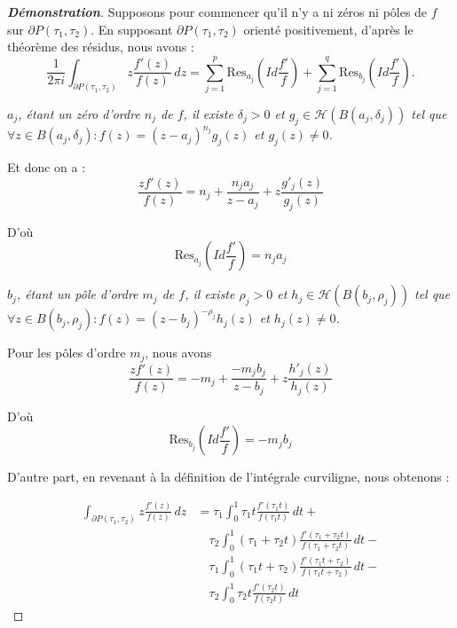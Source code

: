 \documentclass[12pt]{article}
\begin{document}
        \begin{proof}[\textbf{Démonstration}]
        Supposons pour commencer qu'il n'y a ni zéros ni pôles de \( f \) sur \( \partial P(\tau_1, \tau_2) \). En supposant \( \partial P(\tau_1, \tau_2) \) orienté positivement, d'après le théorème des résidus, nous avons :
        \[
        \frac{1}{2\pi i} \int_{\partial P(\tau_1, \tau_2)} z\frac{f'(z)}{f(z)} \, dz = \sum_{j=1}^p \text{Res}_{a_j} \left( Id\frac{f'}{f} \right) + \sum_{j=1}^q \text{Res}_{b_j} \left( Id\frac{f'}{f} \right).
        \]
        

        \textit{$a_j$, étant un zéro d'ordre $n_j$ de $f$, il existe $\delta_j > 0$ et $g_j \in \mathcal{H}(B(a_j, \delta_j))$ tel que $\forall z \in B(a_j, \delta_j): f(z) = (z - a_j)^{n_j} g_j(z)$ et $g_j(z) \neq 0$.}

        Et donc on a :
        \[
        \frac{z f'(z)}{f(z)} = n_j + \frac{n_j a_j}{z - a_j} + z \frac{g'_j(z)}{g_j(z)}
        \]
        
        D'où
        \[
        \text{Res}_{a_j} \left( Id\frac{f'}{f} \right) = n_j a_j
        \]
        
        \textit{$b_j$, étant un pôle d'ordre $m_j$ de $f$, il existe $\rho_j > 0$ et $h_j \in \mathcal{H}(B(b_j, \rho_j))$ tel que $\forall z \in B(b_j, \rho_j) : f(z) = (z - b_j)^{-\rho_j} h_j(z)$ et $h_j(z) \neq 0$.}
        
        Pour les pôles d'ordre $m_j$, nous avons
        \[
        \frac{z f'(z)}{f(z)} = -m_j + \frac{-m_j b_j}{z - b_j} + z\frac{h'_j(z)}{h_j(z)}
        \]
        
        D'où
        \[
        \text{Res}_{b_j} \left( Id\frac{f'}{f} \right) = -m_j b_j
        \]
        
        D'autre part, en revenant à la définition de l'intégrale curviligne, nous obtenons :
        
        \begin{align*}
            \int_{\partial P(\tau_1, \tau_2)} z \frac{f'(z)}{f(z)} \, dz &= \tau_1 \int_0^1 \tau_1 t \frac{f'(\tau_1 t)}{f(\tau_1 t)} \, dt + \\
            &\quad \tau_2 \int_0^1 (\tau_1 + \tau_2 t) \frac{f'(\tau_1 + \tau_2 t)}{f(\tau_1 + \tau_2 t)} \, dt - \\
            &\quad \tau_1 \int_0^1 (\tau_1 t + \tau_2) \frac{f'(\tau_1 t + \tau_2)}{f(\tau_1t + \tau_2)} \, dt - \\
            &\quad \tau_2 \int_0^1 \tau_2 t \frac{f'(\tau_2 t)}{f(\tau_2 t)} \, dt
        \end{align*}
        

\end{proof}
\end{document}
